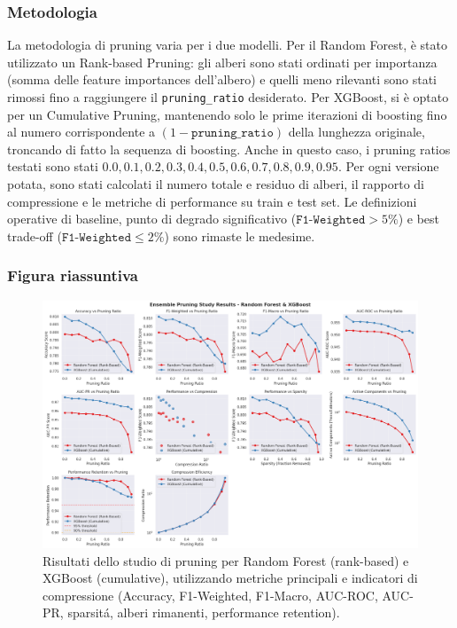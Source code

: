 \documentclass[a4paper,12pt]{report}
\begin{document}
	\subsubsection{Metodologia}
	La metodologia di pruning varia per i due modelli. Per il Random Forest, è stato utilizzato un Rank-based Pruning: gli alberi sono stati ordinati per importanza (somma delle feature importances dell'albero) e quelli meno rilevanti sono stati rimossi fino a raggiungere il \texttt{pruning\_ratio} desiderato. Per XGBoost, si è optato per un Cumulative Pruning, mantenendo solo le prime iterazioni di boosting fino al numero corrispondente a \((1 - \texttt{pruning\_ratio})\) della lunghezza originale, troncando di fatto la sequenza di boosting. Anche in questo caso, i pruning ratios testati sono stati ${0.0,0.1,0.2,0.3,0.4,0.5,0.6,0.7,0.8,0.9,0.95}$. Per ogni versione potata, sono stati calcolati il numero totale e residuo di alberi, il rapporto di compressione e le metriche di performance su train e test set. Le definizioni operative di baseline, punto di degrado significativo ($\texttt{F1-Weighted} >5\%$) e best trade-off ($\texttt{F1-Weighted} \le 2\%$) sono rimaste le medesime.
	
	\subsubsection{Figura riassuntiva}
	\begin{figure}[H]
		\centering
		\includegraphics[width=\textwidth]{img/abl_xgbvsrf_pm.png}
		\caption{Risultati dello studio di pruning per Random Forest (rank-based) e XGBoost (cumulative), utilizzando metriche principali e indicatori di compressione (Accuracy, F1-Weighted, F1-Macro, AUC-ROC, AUC-PR, sparsitá, alberi rimanenti, performance retention).}
	\end{figure}
	
\end{document}
